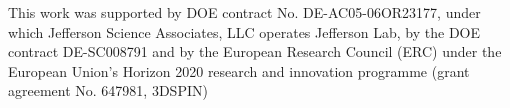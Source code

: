 \documentclass[preprintnumbers,floatfix,nofootinbib]{revtex4}
\begin{document}

\begin{acknowledgments}
This work was supported by DOE contract No. DE-AC05-06OR23177,
under which Jefferson Science Associates, LLC operates Jefferson Lab, by the DOE contract DE-SC008791 and 
by the European Research Council (ERC) under the European Union's 
Horizon 2020 research and innovation programme (grant agreement No. 647981,
3DSPIN)
\end{acknowledgments}




\end{document}
